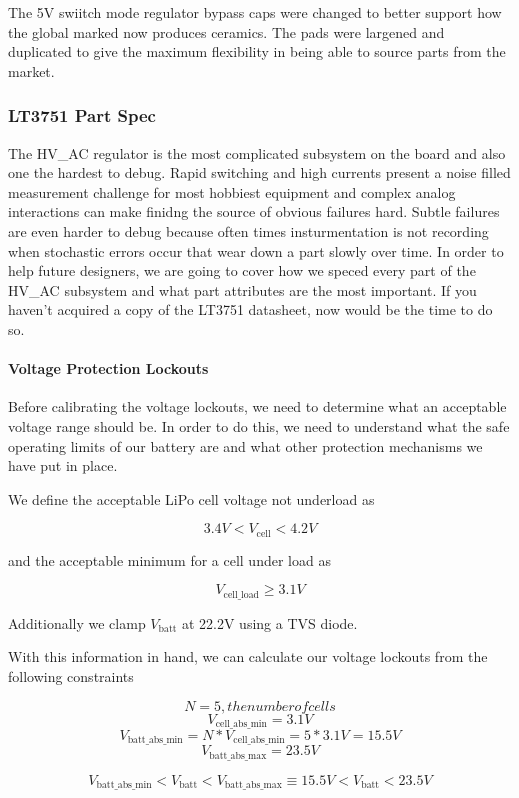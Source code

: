 \documentclass[12pt, letterpaper]{article}
\begin{document}
The 5V swiitch mode regulator bypass caps were changed to better support how the global marked now produces ceramics. The pads were largened and duplicated to give the maximum flexibility in being able to source parts from the market.

\subsubsection{LT3751 Part Spec}
The HV\_AC regulator is the most complicated subsystem on the board and also one the hardest to debug. Rapid switching and high currents present a noise filled measurement challenge for most hobbiest equipment and complex analog interactions can make finidng the source of obvious failures hard. Subtle failures are even harder to debug because often times insturmentation is not recording when stochastic errors occur that wear down a part slowly over time. In order to help future designers, we are going to cover how we speced every part of the HV\_AC subsystem and what part attributes are the most important. If you haven't acquired a copy of the LT3751 datasheet, now would be the time to do so.

\paragraph{Voltage Protection Lockouts}

Before calibrating the voltage lockouts, we need to determine what an acceptable voltage range should be. In order to do this, we need to understand what the safe operating limits of our battery are and what other protection mechanisms we have put in place.

We define the acceptable LiPo cell voltage not underload as 

$$ 3.4 V < V_\mathrm{cell} < 4.2 V $$

and the acceptable minimum for a cell under load as

$$ V_\mathrm{cell\_load} \ge 3.1 V $$

Additionally we clamp $ V_\mathrm{batt} $ at 22.2V using a TVS diode.

With this information in hand, we can calculate our voltage lockouts from the following constraints

$$ N = 5, the number of cells $$
$$ V_\mathrm{cell\_abs\_min} = 3.1 V $$
$$ V_\mathrm{batt\_abs\_min} = N * V_\mathrm{cell\_abs\_min} = 5 * 3.1 V = 15.5 V $$
$$ V_\mathrm{batt\_abs\_max} = 23.5 V $$

\begin{equation} \label{eq:vbatt_range}
V_\mathrm{batt\_abs\_min} < V_\mathrm{batt} < V_\mathrm{batt\_abs\_max} \equiv 15.5 V < V_\mathrm{batt} < 23.5 V
\end{equation}
\end{document}
